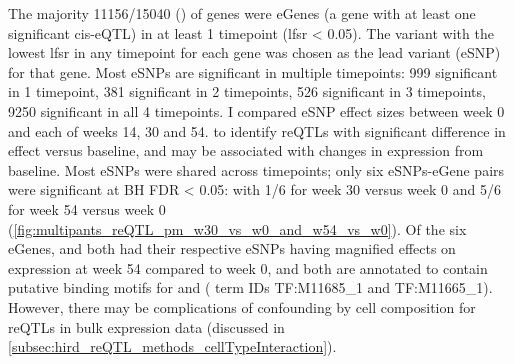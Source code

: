 \begin{outline}

The majority 11156/15040 () of genes were eGenes (a gene with at least one significant cis-eQTL) in at least 1 timepoint (lfsr < 0.05).
The variant with the lowest lfsr in any timepoint for each gene was 
chosen as the lead variant (eSNP) for that gene.
Most eSNPs are significant in multiple timepoints: 999 significant in 1 timepoint, 381 significant in 2 timepoints, 526 significant in 3 timepoints, 9250 significant in all 4 timepoints.
I compared eSNP effect sizes between week 0 and each of weeks 14, 30 and 54.
to identify \glspl{reQTL} with significant difference in effect versus baseline,
and may be associated with changes in expression from baseline.
Most eSNPs were shared across timepoints;
only six eSNPs-eGene pairs were significant at BH FDR < 0.05:
with 1/6 for week 30 versus week 0 and 5/6 for week 54 versus week 0 (\autoref{fig:multipants_reQTL_pm_w30_vs_w0_and_w54_vs_w0}).
Of the six eGenes,  and  both had their respective eSNPs having magnified effects on expression at week 54 compared to week 0,
and both are annotated to contain putative binding motifs for  and  ( term IDs TF:M11685\_1 and TF:M11665\_1).
However, there may be complications of confounding  by cell composition for reQTLs in bulk expression data (discussed in \autoref{subsec:hird_reQTL_methods_cellTypeInteraction}).



\end{outline}

